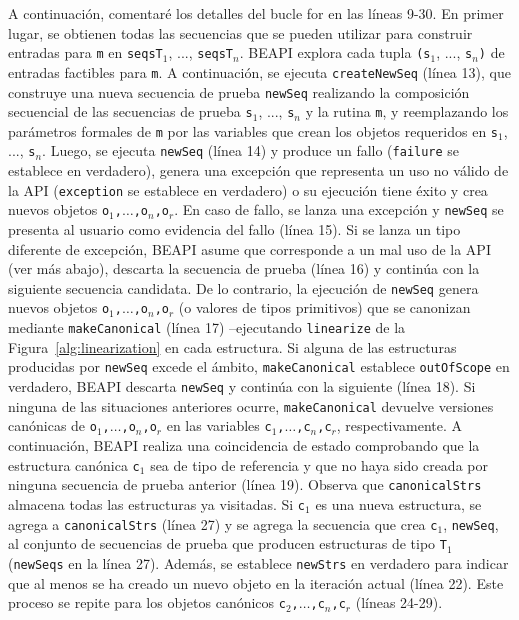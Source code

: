 A continuación, comentaré los detalles del bucle for en las líneas 9-30. En primer lugar, se obtienen todas las secuencias que se pueden utilizar para construir entradas para \texttt{m} en \texttt{seqsT$_1$}, ..., \texttt{seqsT$_n$}. \textsf{BEAPI} explora cada tupla \texttt{(s$_1$}, ..., \texttt{s$_n$)} de entradas factibles para \texttt{m}. A continuación, se ejecuta \texttt{createNewSeq} (línea 13), que construye una nueva secuencia de prueba \texttt{newSeq} realizando la composición secuencial de las secuencias de prueba \texttt{s$_1$}, ..., \texttt{s$_n$} y la rutina \texttt{m}, y reemplazando los parámetros formales de \texttt{m} por las variables que crean los objetos requeridos en \texttt{s$_1$}, ..., \texttt{s$_n$}. Luego, se ejecuta \texttt{newSeq} (línea 14) y produce un fallo (\texttt{failure} se establece en verdadero), genera una excepción que representa un uso no válido de la API (\texttt{exception} se establece en verdadero) o su ejecución tiene éxito y crea nuevos objetos \texttt{o$_1$,$\ldots$,o$_n$,o$_r$}. En caso de fallo, se lanza una excepción y \texttt{newSeq} se presenta al usuario como evidencia del fallo (línea 15). Si se lanza un tipo diferente de excepción, \textsf{BEAPI} asume que corresponde a un mal uso de la API (ver más abajo), descarta la secuencia de prueba (línea 16) y continúa con la siguiente secuencia candidata. De lo contrario, la ejecución de \texttt{newSeq} genera nuevos objetos \texttt{o$_1$,$\ldots$,o$_n$,o$_r$} (o valores de tipos primitivos) que se canonizan mediante \texttt{makeCanonical} (línea 17) --ejecutando \texttt{linearize} de la Figura~\ref{alg:linearization} en cada estructura. Si alguna de las estructuras producidas por \texttt{newSeq} excede el ámbito, \texttt{makeCanonical} establece \texttt{outOfScope} en verdadero, \textsf{BEAPI} descarta \texttt{newSeq} y continúa con la siguiente (línea 18).
Si ninguna de las situaciones anteriores ocurre, \texttt{makeCanonical} devuelve versiones canónicas de \texttt{o$_1$,$\ldots$,o$_n$,o$_r$} en las variables \texttt{c$_1$,$\ldots$,c$_n$,c$_r$}, respectivamente. A continuación, \textsf{BEAPI} realiza una coincidencia de estado comprobando que la estructura canónica \texttt{c$_1$} sea de tipo de referencia y que no haya sido creada por ninguna secuencia de prueba anterior (línea 19). Observa que \texttt{canonicalStrs} almacena todas las estructuras ya visitadas. Si \texttt{c$_1$} es una nueva estructura, se agrega a \texttt{canonicalStrs} (línea 27) y se agrega la secuencia que crea \texttt{c$_1$}, \texttt{newSeq}, al conjunto de secuencias de prueba que producen estructuras de tipo \texttt{T$_1$} (\texttt{newSeqs} en la línea 27). Además, se establece \texttt{newStrs} en verdadero para indicar que al menos se ha creado un nuevo objeto en la iteración actual (línea 22). Este proceso se repite para los objetos canónicos \texttt{c$_2$,$\ldots$,c$_n$,c$_r$} (líneas 24-29).

